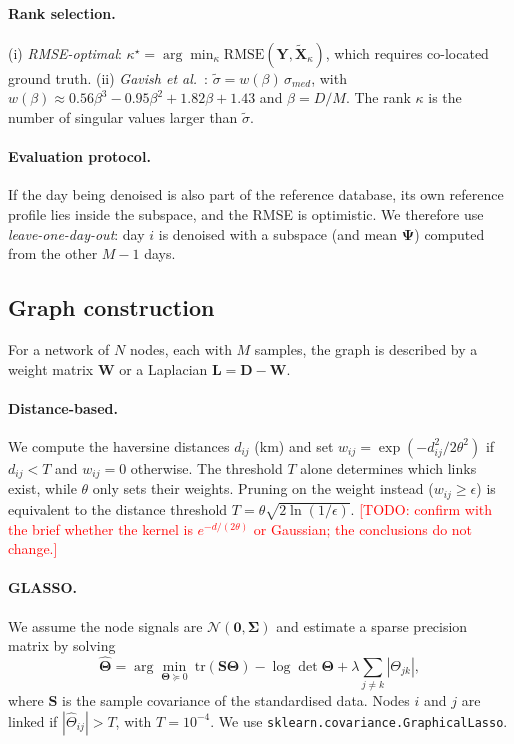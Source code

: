 \documentclass[11pt,a4paper]{article}
\newcommand{\todo}[1]{\textcolor{red}{[TODO: #1]}}
\begin{document}
\paragraph{Rank selection.} (i) \emph{RMSE-optimal}: $\kappa^\star=\arg\min_\kappa \mathrm{RMSE}(\mathbf Y,\tilde{\mathbf X}_\kappa)$, which requires co-located ground truth. (ii) \emph{Gavish et al.}~\cite{gavish2014}: $\tilde\sigma=w(\beta)\,\sigma_{med}$, with $w(\beta)\approx0.56\beta^3-0.95\beta^2+1.82\beta+1.43$ and $\beta=D/M$. The rank $\kappa$ is the number of singular values larger than $\tilde\sigma$.

\paragraph{Evaluation protocol.} If the day being denoised is also part of the reference database, its own reference profile lies inside the subspace, and the RMSE is optimistic. We therefore use \emph{leave-one-day-out}: day $i$ is denoised with a subspace (and mean $\boldsymbol\Psi$) computed from the other $M-1$ days.

\subsection{Graph construction}
For a network of $N$ nodes, each with $M$ samples, the graph is described by a weight matrix $\mathbf W$ or a Laplacian $\mathbf L=\mathbf D-\mathbf W$.
\paragraph{Distance-based.} We compute the haversine distances $d_{ij}$ (km) and set $w_{ij}=\exp(-d_{ij}^2/2\theta^2)$ if $d_{ij}<T$ and $w_{ij}=0$ otherwise. The threshold $T$ alone determines which links exist, while $\theta$ only sets their weights. Pruning on the weight instead ($w_{ij}\ge\epsilon$) is equivalent to the distance threshold $T=\theta\sqrt{2\ln(1/\epsilon)}$. \todo{confirm with the brief whether the kernel is $e^{-d/(2\theta)}$ or Gaussian; the conclusions do not change.}
\paragraph{GLASSO.} We assume the node signals are $\mathcal N(\mathbf 0,\boldsymbol\Sigma)$ and estimate a sparse precision matrix by solving
\begin{equation}
  \hat{\boldsymbol\Theta}=\arg\min_{\boldsymbol\Theta\succeq0}\ \mathrm{tr}(\mathbf S\boldsymbol\Theta)-\log\det\boldsymbol\Theta+\lambda\textstyle\sum_{j\neq k}|\Theta_{jk}|,
\end{equation}
where $\mathbf S$ is the sample covariance of the standardised data. Nodes $i$ and $j$ are linked if $|\hat\Theta_{ij}|>T$, with $T=10^{-4}$. We use \texttt{sklearn.covariance.GraphicalLasso}.
\end{document}
